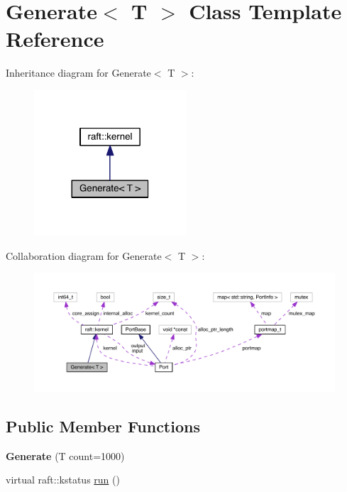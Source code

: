 \hypertarget{class_generate}{}\section{Generate$<$ T $>$ Class Template Reference}
\label{class_generate}


Inheritance diagram for Generate$<$ T $>$\+:
\nopagebreak
\begin{figure}[H]
\begin{center}
\leavevmode
\includegraphics[width=161pt]{class_generate__inherit__graph}
\end{center}
\end{figure}


Collaboration diagram for Generate$<$ T $>$\+:
\nopagebreak
\begin{figure}[H]
\begin{center}
\leavevmode
\includegraphics[width=350pt]{class_generate__coll__graph}
\end{center}
\end{figure}
\subsection*{Public Member Functions}
\begin{DoxyCompactItemize}
\item 
\hypertarget{class_generate_a7c3f2c1b2ae8b2202c5441b60c5f0e6b}{}\label{class_generate_a7c3f2c1b2ae8b2202c5441b60c5f0e6b} 
{\bfseries Generate} (T count=1000)
\item 
virtual raft\+::kstatus \hyperlink{class_generate_aa8253370207e1457b9b79e62253c2925}{run} ()
\end{DoxyCompactItemize}
